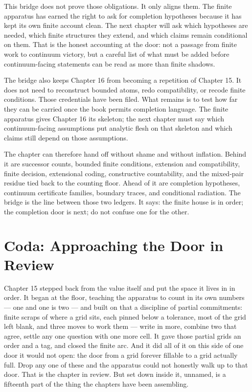 This bridge does not prove those obligations. It only aligns them. The finite
apparatus has earned the right to ask for completion hypotheses because it has
kept its own finite account clean. The next chapter will ask which hypotheses
are needed, which finite structures they extend, and which claims remain
conditional on them. That is the honest accounting at the door: not a passage
from finite work to continuum victory, but a careful list of what must be added
before continuum-facing statements can be read as more than finite shadows.

The bridge also keeps Chapter 16 from becoming a repetition of Chapter 15. It
does not need to reconstruct bounded atoms, redo compatibility, or recode finite
conditions. Those credentials have been filed. What remains is to test how far
they can be carried once the book permits completion language. The finite
apparatus gives Chapter 16 its skeleton; the next chapter must say which
continuum-facing assumptions put analytic flesh on that skeleton and which
claims still depend on those assumptions.

The chapter can therefore hand off without shame and without inflation. Behind
it are successor counts, bounded finite conditions, extension and compatibility,
finite decision, extensional coding, constructive countability, and the
mixed-pair residue tied back to the counting floor. Ahead of it are completion
hypotheses, continuum certificate families, boundary traces, and conditional
radiation. The bridge is the line between those two ledgers. It says: the finite
house is in order; the completion door is next; do not confuse one for the
other.

\section*{Coda: Approaching the Door in Review}

Chapter 15 stepped back from the value itself and put the space it lives in in order. It began at the floor, teaching the apparatus to count in its own numbers --- one and one is two --- and built on that a discipline of partial commitments: finite scraps of where a grid sits, each pinned below a tolerance, most of the grid left blank, and three moves to work them --- write in more, combine two that agree, settle any one question with one more cell. It gave those partial grids an order and a tag, and closed the finite arc. And it did all of it on this side of one door it would not open: the door from a grid forever fillable to a grid actually full. Drop any one of these and the apparatus could not honestly walk up to that door. That is the chapter in review. But set down inside it, unnamed, is a fifteenth part of the thing the chapters have been assembling.

